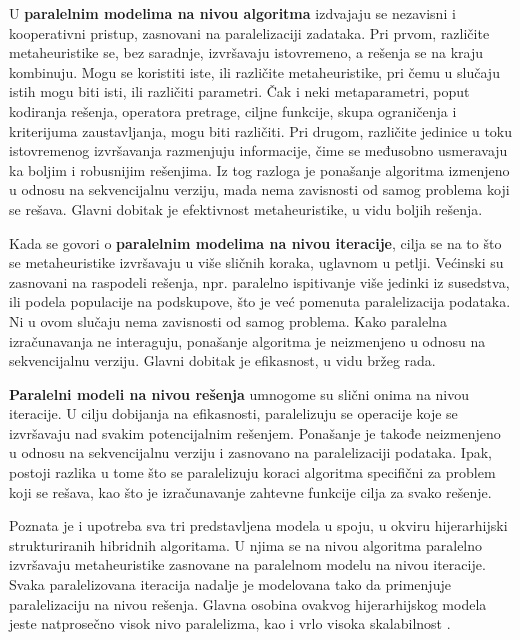 \documentclass[a4paper]{article}
\begin{document}
U \textbf{paralelnim modelima na nivou algoritma} izdvajaju se nezavisni i kooperativni pristup, zasnovani na paralelizaciji zadataka. Pri prvom, različite metaheuristike se, bez saradnje, izvršavaju istovremeno, a rešenja se na kraju kombinuju. Mogu se koristiti iste, ili različite metaheuristike, pri čemu u slučaju istih mogu biti isti, ili različiti parametri. Čak i neki metaparametri, poput kodiranja rešenja, operatora pretrage, ciljne funkcije, skupa ograničenja i kriterijuma zaustavljanja, mogu biti različiti. Pri drugom, različite jedinice u toku istovremenog izvršavanja razmenjuju informacije, čime se međusobno usmeravaju ka boljim i robusnijim rešenjima. Iz tog razloga je ponašanje algoritma izmenjeno u odnosu na sekvencijalnu verziju, mada nema zavisnosti od samog problema koji se rešava. Glavni dobitak je efektivnost metaheuristike, u vidu boljih rešenja.

Kada se govori o \textbf{paralelnim modelima na nivou iteracije}, cilja se na to što se metaheuristike izvršavaju u više sličnih koraka, uglavnom u petlji. Većinski su zasnovani na raspodeli rešenja, npr. paralelno ispitivanje više jedinki iz susedstva, ili podela populacije na podskupove, što je već pomenuta paralelizacija podataka. Ni u ovom slučaju nema zavisnosti od samog problema. Kako paralelna izračunavanja ne interaguju, ponašanje algoritma je neizmenjeno u odnosu na sekvencijalnu verziju. Glavni dobitak je efikasnost, u vidu bržeg rada.

\textbf{Paralelni modeli na nivou rešenja} umnogome su slični onima na nivou iteracije. U cilju dobijanja na efikasnosti, paralelizuju se operacije koje se izvršavaju nad svakim potencijalnim rešenjem. Ponašanje je takođe neizmenjeno u odnosu na sekvencijalnu verziju i zasnovano na paralelizaciji podataka. Ipak, postoji razlika u tome što se paralelizuju koraci algoritma specifični za problem koji se rešava, kao što je izračunavanje zahtevne funkcije cilja za svako rešenje.

Poznata je i upotreba sva tri predstavljena modela u spoju, u okviru hijerarhijski strukturiranih hibridnih algoritama. U njima se na nivou algoritma paralelno izvršavaju metaheuristike zasnovane na paralelnom modelu na nivou iteracije. Svaka paralelizovana iteracija nadalje je modelovana tako da primenjuje paralelizaciju na nivou rešenja. Glavna osobina ovakvog hijerarhijskog modela jeste natprosečno visok nivo paralelizma, kao i vrlo visoka skalabilnost \cite{talbi}.
\end{document}
